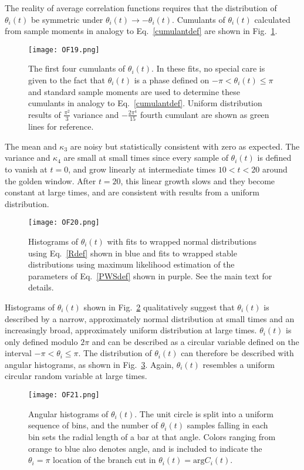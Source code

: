 The reality of  average correlation functions requires that the distribution of $\theta_i(t)$ be symmetric under 
$\theta_i(t) \rightarrow -\theta_i(t)$. 
Cumulants of $\theta_i(t)$ calculated from sample moments in analogy to Eq.~\eqref{cumulantdef} are shown in Fig.~\ref{ThCumulants}. 
%
\begin{figure}[!ht]
  \centering
  \texttt{[image: OF19.png]}
  \caption{
  The first four cumulants of $\theta_i(t)$. 
  In these fits, no special care is given to the fact that $\theta_i(t)$ is a phase defined on $-\pi<\theta_i(t)\leq \pi$ and standard sample moments 
  are used to determine these cumulants in analogy to Eq.~\eqref{cumulantdef}. 
  Uniform distribution results of $\frac{\pi^2}{3}$ variance and $-\frac{2\pi^4}{15}$ 
  fourth cumulant are shown as green
   lines for reference.
  }
  \label{ThCumulants}
\end{figure}
%
The mean and $\kappa_3$ are noisy but statistically consistent with zero as expected. 
The variance and $\kappa_4$ are small at small times since every sample of $\theta_i(t)$ is defined to vanish at $t=0$, and grow linearly 
at intermediate times $10 < t < 20$ around the golden window. 
After $t=20$, this linear growth slows and they become constant at large times, and are consistent with results from a uniform distribution. 
%
\begin{figure}[!ht]
  \centering
  \texttt{[image: OF20.png]}
  \caption{
    Histograms of $\theta_i(t)$ with fits to wrapped normal distributions using Eq.~\eqref{Rdef} shown in blue and fits to wrapped stable distributions using maximum likelihood estimation of the parameters of Eq.~\eqref{PWSdef} shown in purple.
  See the main text for details.
  }
  \label{ThHistograms}
\end{figure}
%
Histograms of $\theta_i(t)$ shown in Fig.~\ref{ThHistograms} qualitatively suggest that $\theta_i(t)$ is described by a narrow, 
approximately normal distribution at small times and an increasingly broad, approximately uniform distribution at large times. 
$\theta_i(t)$ is only defined modulo $2\pi$ and can be described as a circular variable defined on the interval 
$-\pi < \theta_i \leq \pi$. 
The distribution of $\theta_i(t)$ can therefore be described with angular histograms, as shown in Fig.~\ref{ThAngularHistograms}. 
Again, $\theta_i(t)$ resembles a uniform circular random variable at large times.
%
\begin{figure}[!ht]
  \centering
  \texttt{[image: OF21.png]}
  \caption{
  Angular histograms of $\theta_i(t)$. 
  The unit circle is split into a uniform sequence of bins, and the number of $\theta_i(t)$ samples falling in 
  each bin sets the radial length of a bar at that angle.
  Colors ranging from orange to blue also denotes angle, and is included to indicate the $\theta_i = \pi$ location of the branch cut in $\theta_i(t) = \text{arg} C_i(t)$.
  }
  \label{ThAngularHistograms}
\end{figure}
%


